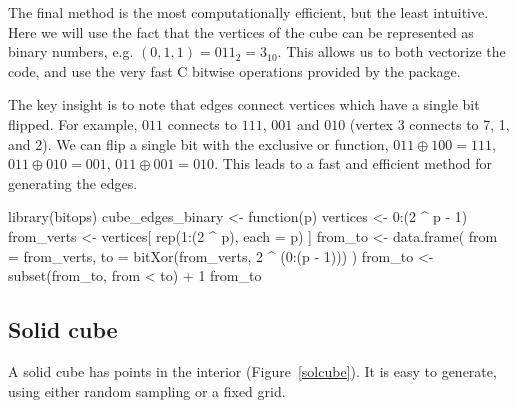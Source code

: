 \begin{itemize}
    The final method is the most computationally efficient, but the
    least intuitive. Here we will use the fact that the vertices of
    the cube can be represented as binary numbers, e.g.  $(0, 1, 1) =
    011_2 = 3_{10}$. This allows us to both vectorize the code, and
    use the very fast C bitwise operations provided by the
     package.

    The key insight is to note that edges connect vertices which have
    a single bit flipped. For example, $011$ connects to $111$, $001$
    and $010$ (vertex 3 connects to 7, 1, and 2). We can flip a single
    bit with the exclusive or function, $011 \oplus 100 = 111$, $011
    \oplus 010 = 001$, $011 \oplus 001 = 010$.  This leads to a fast
    and efficient method for generating the edges.

\newpage
\begin{example}
library(bitops)
cube_edges_binary <- function(p) {
  vertices <- 0:(2 ^ p - 1)
  from_verts <- vertices[
    rep(1:(2 ^ p), each = p)
  ]
  from_to <- data.frame(
    from = from_verts,
    to = bitXor(from_verts, 2 ^ (0:(p - 1)))
  )
  from_to <- subset(from_to, from < to) + 1
  from_to
}
\end{example}

\end{itemize}


\subsection{Solid cube}

A solid cube has points in the interior (Figure~\ref{solcube}). It is
easy to generate, using either random sampling or a fixed grid.

